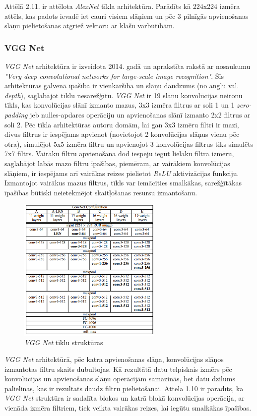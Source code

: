 Attēlā 2.11. ir attēlota \textit{AlexNet} tīkla arhitektūra. Parādīts kā 224x224 izmēra attēls, kas padots ievadē iet cauri visiem slāņiem un pēc 3 pilnīgās apvienošanas slāņu pielietošanas atgriež vektoru ar klašu varbūtībām.
\subsubsection{VGG Net}
\textit{VGG Net} arhitektūra ir izveidota 2014. gadā un aprakstīta rakstā ar nosaukumu \textit{"Very deep convolutional networks for large-scale image recognition"}\cite{simonyan2014very}. Šīs arhitektūras galvenā īpašība ir vienkāršība un slāņu daudzums (no angļu val. \textit{depth}), saglabājot tīklu nesarežģītu. \textit{VGG Net} ir 19 slāņu konvolūcijas neironu tīkls, kas konvolūcijas slānī izmanto mazus, 3x3 izmēra filtrus ar soli 1 un 1 \textit{zero-padding} jeb nulles-apdares operāciju un apvienošanas slānī izmanto 2x2 filtrus ar soli 2.
Pēc tīkla arhitektūras autoru domām, lai gan 3x3 izmēru filtri ir mazi, divus filtrus ir iespējams apvienot (novietojot 2 konvolūcijas slāņus vienu pēc otra), simulējot 5x5 izmēra filtru un apvienojot 3 konvolūcijas filtrus tiks simulēts 7x7 filtrs. Vairāku filtru apvienošana dod iespēju iegūt lielāku filtra izmēru, saglabājot labās mazo filtru īpašības, piemēram, ar vairākiem konvolūcijas slāņiem, ir iespējams arī vairākas reizes pielietot \textit{ReLU} aktivizācijas funkciju. Izmantojot vairākus mazus filtrus, tīkls var iemācīties smalkākas, sarežģītākas īpašības būtiski neietekmējot skaitļošanas resursu izmantošanu.
\begin{figure}[h]%
	\centering
	\includegraphics[height=7cm]{images/vggnet.png} %
	\caption{\textit{VGG Net} tīklu struktūras \cite{simonyan2014very}}%
	\label{fig:example}%
\end{figure}

\textit{VGG Net} arhitektūrā, pēc katra apvienošanas slāņa, konvolūcijas slāņos izmantotas filtru skaits dubultojas. Kā rezultātā datu telpiskais izmērs pēc konvolūcijas un apvienošanas slāņu operācijām samazinās, bet datu dziļums palielinās, kas ir rezultāts daudz filtru pielietošanai. Attēlā 1.10 ir parādīts, ka \textit{VGG Net} struktūra ir sadalīta blokos un katrā blokā konvolūcijas operācija, ar vienāda izmēra filtriem, tiek veikta vairākas reizes, lai iegūtu smalkākas īpašības.
